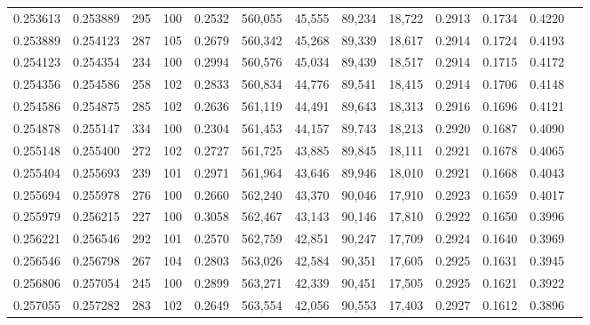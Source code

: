 \begin{tabular}{rrrrrrrrrrrrr}
0.253613 & 0.253889 &   295 & 100 &                                     0.2532 & 560,055 &  45,555 &  89,234 &  18,722 & 0.2913 & 0.1734 & 0.4220 \\
0.253889 & 0.254123 &   287 & 105 &                                     0.2679 & 560,342 &  45,268 &  89,339 &  18,617 & 0.2914 & 0.1724 & 0.4193 \\
0.254123 & 0.254354 &   234 & 100 &                                     0.2994 & 560,576 &  45,034 &  89,439 &  18,517 & 0.2914 & 0.1715 & 0.4172 \\
0.254356 & 0.254586 &   258 & 102 &                                     0.2833 & 560,834 &  44,776 &  89,541 &  18,415 & 0.2914 & 0.1706 & 0.4148 \\
0.254586 & 0.254875 &   285 & 102 &                                     0.2636 & 561,119 &  44,491 &  89,643 &  18,313 & 0.2916 & 0.1696 & 0.4121 \\
0.254878 & 0.255147 &   334 & 100 &                                     0.2304 & 561,453 &  44,157 &  89,743 &  18,213 & 0.2920 & 0.1687 & 0.4090 \\
0.255148 & 0.255400 &   272 & 102 &                                     0.2727 & 561,725 &  43,885 &  89,845 &  18,111 & 0.2921 & 0.1678 & 0.4065 \\
0.255404 & 0.255693 &   239 & 101 &                                     0.2971 & 561,964 &  43,646 &  89,946 &  18,010 & 0.2921 & 0.1668 & 0.4043 \\
0.255694 & 0.255978 &   276 & 100 &                                     0.2660 & 562,240 &  43,370 &  90,046 &  17,910 & 0.2923 & 0.1659 & 0.4017 \\
0.255979 & 0.256215 &   227 & 100 &                                     0.3058 & 562,467 &  43,143 &  90,146 &  17,810 & 0.2922 & 0.1650 & 0.3996 \\
0.256221 & 0.256546 &   292 & 101 &                                     0.2570 & 562,759 &  42,851 &  90,247 &  17,709 & 0.2924 & 0.1640 & 0.3969 \\
0.256546 & 0.256798 &   267 & 104 &                                     0.2803 & 563,026 &  42,584 &  90,351 &  17,605 & 0.2925 & 0.1631 & 0.3945 \\
0.256806 & 0.257054 &   245 & 100 &                                     0.2899 & 563,271 &  42,339 &  90,451 &  17,505 & 0.2925 & 0.1621 & 0.3922 \\
0.257055 & 0.257282 &   283 & 102 &                                     0.2649 & 563,554 &  42,056 &  90,553 &  17,403 & 0.2927 & 0.1612 & 0.3896 \\

\end{tabular}
